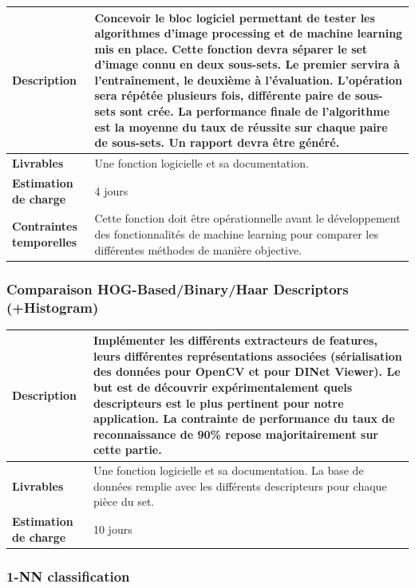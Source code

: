 \begin{tabularx}{13cm}{lX}
    \toprule
        \textbf{Description} &
        Concevoir le bloc logiciel permettant de tester les algorithmes d'image processing et de machine learning mis en place.
        Cette fonction devra séparer le set d'image connu en deux sous-sets.
        Le premier servira à l'entraînement, le deuxième à l'évaluation.
        L'opération sera répétée plusieurs fois, différente paire de sous-sets sont crée.
        La performance finale de l'algorithme est la moyenne du taux de réussite sur chaque paire de sous-sets.
        Un rapport devra être généré. \\
    \midrule
        \textbf{Livrables} &
        Une fonction logicielle et sa documentation. \\
    \midrule
        \textbf{Estimation de charge} &
        4 jours \\
    \midrule
        \textbf{Contraintes temporelles} &
        Cette fonction doit être opérationnelle avant le développement des fonctionnalités de machine learning pour comparer les différentes méthodes de manière objective. \\
    \bottomrule
\end{tabularx}

\subsubsection{Comparaison HOG-Based/Binary/Haar Descriptors (+Histogram)}

\begin{tabularx}{13cm}{lX}
    \toprule
        \textbf{Description} &
        Implémenter les différents extracteurs de features, leurs différentes représentations associées (sérialisation des données pour OpenCV et pour DINet Viewer).
        Le but est de découvrir expérimentalement quels descripteurs est le plus pertinent pour notre application. La contrainte de performance du taux de reconnaissance de 90\% repose majoritairement sur cette partie.\\
    \midrule
        \textbf{Livrables} &
        Une fonction logicielle et sa documentation.
        La base de données remplie avec les différents descripteurs pour chaque pièce du set. \\
    \midrule
        \textbf{Estimation de charge} &
        10 jours \\
    \bottomrule
\end{tabularx}

\subsubsection{1-NN classification}

